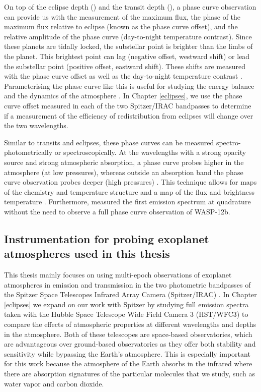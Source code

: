 On top of the eclipse depth (\fpfs) and the transit depth (\rprss), a phase curve observation can provide us with the measurement of the maximum flux, the phase of the maximum flux relative to eclipse (known as the phase curve offset), and the relative amplitude of the phase curve (day-to-night temperature contrast). Since these planets are tidally locked, the substellar point is brighter than the limbs of the planet. This brightest point can lag (negative offset, westward shift) or lead the substellar point (positive offset, eastward shift). These shifts are measured with the phase curve offset as well as the day-to-night temperature contrast \citep{Showman2002}. Parameterising the phase curve like this is useful for studying the energy balance and the dynamics of the atmosphere \citep{Cowan2012b, Schwartz2015}. In Chapter \ref{eclipses}, we use the phase curve offset measured in each of the two Spitzer/IRAC bandpasses to determine if a measurement of the efficiency of redistribution from eclipses will change over the two wavelengths.

Similar to transits and eclipses, these phase curves can be measured spectro-photometrically or spectroscopically. At the wavelengths with a strong opacity source and strong atmospheric absorption, a phase curve probes higher in the atmosphere (at low pressures), whereas outside an absorption band the phase curve observation probes deeper (high pressures) \citep{Showman2009, Kataria2015}. This technique allows for maps of the chemistry and temperature structure and a map of the flux and brightness temperature \citep{Cowan2008, Showman2008, Knutson2009c, Stevenson2017}. Furthermore, \citet{Arcangeli2021} measured the first emission spectrum at quadrature without the need to observe a full phase curve observation of WASP-12b.

\subsection{Instrumentation for probing exoplanet atmospheres used in this thesis} %

This thesis mainly focuses on using multi-epoch observations of exoplanet atmospheres in emission and transmission in the two photometric bandpasses of the Spitzer Space Telescopes Infrared Array Camera (Spitzer/IRAC) \citep{Werner2004}. In Chapter \ref{eclipses} we expand on our work with Spitzer by studying full emission spectra taken with the Hubble Space Telescope Wide Field Camera 3 (HST/WFC3) to compare the effects of atmospheric properties at different wavelengths and depths in the atmosphere. Both of these telescopes are space-based observatories, which are advantageous over ground-based observatories as they offer both stability and sensitivity while bypassing the Earth's atmosphere. This is especially  important for this work because the atmosphere of the Earth absorbs in the infrared where there are absorption signatures of the particular  molecules that we study, such as water vapor and carbon dioxide.

